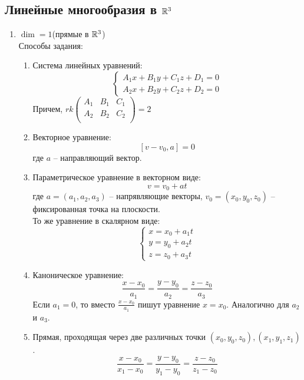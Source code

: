\subsection*{Линейные многообразия в $\mathbb{R}^3$}
\begin{enumerate}
	\item $\dim = 1$(прямые в $\mathbb{R}^3$) \\
	Способы задания:
	\begin{enumerate}[label={1.\arabic*)}]
		\item Система линейных уравнений:
				\[
				\begin{cases}
				A_1x + B_1y + C_1z + D_1 = 0 \\
				A_2x + B_2y + C_2z + D_2 = 0
				\end{cases}
				\]
				Причем,
				$
				rk \begin{pmatrix}
							A_1 & B_1 & C_1 \\
							A_2 & B_2 & C_2 \\
						\end{pmatrix} 
					= 2
				$
		
		\item Векторное уравнение:
				$$[v - v_0, a] = 0$$ где $a$ -- направляющий вектор.
		\item Параметрическое уравнение в векторном виде:
				$$v = v_0 + at$$ где $a = (a_1, a_2, a_3)$ -- напрявляющие векторы, 
				$v_0 = (x_0 , y_0, z_0)$ -- фиксированная точка на плоскости. \\ 
				То же уравнение в скалярном виде:
				$$\begin{cases}
						x = x_0 + a_1t \\
						y = y_0 + a_2t \\
						z = z_0 + a_3t
					\end{cases}$$
		\item Каноническое уравнение:
				$$\frac{x - x_0}{a_1} = \frac{y - y_0}{a_2} = \frac{z - z_0}{a_3}$$
				Если $a_1 = 0$, то вместо $\displaystyle{\frac{x - x_0}{a_1}}$ пишут уравнение $x = x_0$. Аналогично для $a_2$ и $a_3$.
				
		\item Прямая, проходящая через две различных точки $(x_0, y_0, z_0), (x_1, y_1, z_1)$.
				$$\frac{x - x_0}{x_1 - x_0} = \frac{y - y_0}{y_1 - y_0} = \frac{z - z_0}{z_1 - z_0}$$
	\end{enumerate}


\end{enumerate}
